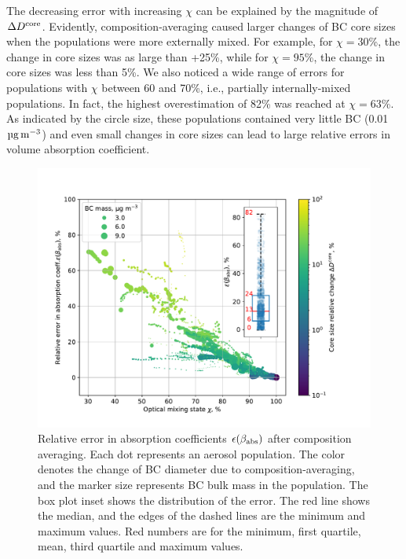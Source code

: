 \documentclass[edeposit,fullpage]{uiucthesis2009}
\makeatletter
\DeclareRobustCommand*\unit[1]
 {\ensuremath{%
   {\thinmuskip3mu\relax
    \def\mu{\text{\textmu}}\def~{\,}%
    \ifx\f@series\testbx\mathbf{#1}\else\mathrm{#1}\fi}}}
\makeatother
\begin{document}
The decreasing error with increasing $\chi$ can be explained by the
magnitude of $\Delta{D^{\rm core}}$. Evidently, composition-averaging
caused larger changes of BC core sizes when the populations were more
externally mixed. For example, for $\chi=30$\%, the change in core
sizes was as large than +25\%, while for $\chi=95$\%, the change in
core sizes was less than 5\%.  We also noticed a wide range of errors
for populations with $\chi$ between 60 and 70\%, i.e., partially
internally-mixed populations. In fact, the highest overestimation of
82\% was reached at $\chi= 63$\%. As indicated by the circle size,
these populations contained very little BC (0.01~\unit{\mu g\,m^{-3}})
and even small changes in core sizes can lead to large relative errors
in volume absorption coefficient.
\begin{figure}
	\centering
	\includegraphics[scale=0.55]{chap4_figs/fig4.pdf}
	\caption{Relative error in absorption coefficients
          $\epsilon(\beta_{\rm abs})$ after composition
          averaging. Each dot represents an aerosol population. The
          color denotes the change of BC diameter due to
          composition-averaging, and the marker size represents BC
          bulk mass in the population. The box plot inset shows the
          distribution of the error. The red line shows the median,
          and the edges of the dashed lines are the minimum and
          maximum values. Red numbers are for the minimum, first
          quartile, mean, third quartile and maximum values.}
	\label{fig3:abs-error}
\end{figure}
\end{document}
